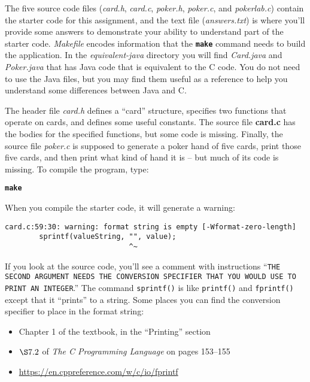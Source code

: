 \begin{description}
\end{description}

The five source code files (\textit{card.h}, \textit{card.c}, \textit{poker.h}, \textit{poker.c}, and \textit{pokerlab.c}) contain the starter code for this assignment, and the text file (\textit{answers.txt}) is where you'll provide some answers to demonstrate your ability to understand part of the starter code.
\textit{Makefile} encodes information that the \textbf{\texttt{make}} command needs to build the application.
In the \mbox{\textit{equivalent-java}} directory you will find \textit{Card.java} and \textit{Poker.java} that has Java code that is equivalent to the C code.
You do not need to use the Java files, but you may find them useful as a reference to help you understand some differences between Java and C\@.

The header file \textit{card.h} defines a ``card'' structure, specifies two functions that operate on cards, and defines some useful constants.
The source file \textbf{card.c} has the bodies for the specified functions, but some code is missing.
Finally, the source file \textit{poker.c} is supposed to generate a poker hand of five cards, print those five cards, and then print what kind of hand it is -- but much of its code is missing.
To compile the program, type:

\textbf{\texttt{make}}

When you compile the starter code, it will generate a warning:

\begin{verbatim}
card.c:59:30: warning: format string is empty [-Wformat-zero-length]
        sprintf(valueString, "", value);
                             ^~
\end{verbatim}

\begin{description}
\end{description}
If you look at the source code, you'll see a comment with instructions ``\texttt{THE SECOND ARGUMENT NEEDS THE CONVERSION SPECIFIER THAT YOU WOULD USE TO PRINT AN INTEGER}.''
The command \lstinline{sprintf()} is like \lstinline{printf()} and \lstinline{fprintf()} except that it ``prints'' to a string.
Some places you can find the conversion specifier to place in the format string:
\begin{itemize}
    \item Chapter 1 of the textbook, in the ``Printing'' section
    \item $\S7.2$ of \textit{The C Programming Language} on pages 153--155
    \item \url{https://en.cppreference.com/w/c/io/fprintf}
\end{itemize}



